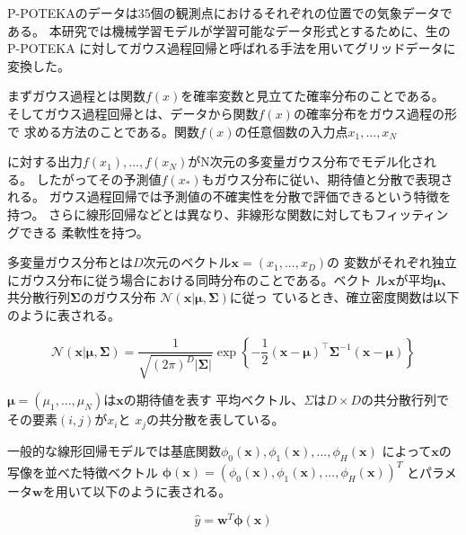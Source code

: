 P-POTEKAのデータは35個の観測点におけるそれぞれの位置での気象データである。
本研究では機械学習モデルが学習可能なデータ形式とするために、生のP-POTEKA
に対してガウス過程回帰と呼ばれる手法を用いてグリッドデータに変換した。

まずガウス過程とは関数$f(x)$を確率変数と見立てた確率分布のことである。
そしてガウス過程回帰とは、データから関数$f(x)$の確率分布をガウス過程の形で
求める方法のことである。関数$f(x)$の任意個数の入力点$x_{1}, ..., x_{N}$

に対する出力$f(x_{1}), ..., f(x_{N})$がN次元の多変量ガウス分布でモデル化される。
したがってその予測値$f(x_{*})$もガウス分布に従い、期待値と分散で表現される。
ガウス過程回帰では予測値の不確実性を分散で評価できるという特徴を持つ。
さらに線形回帰などとは異なり、非線形な関数に対してもフィッティングできる
柔軟性を持つ。

多変量ガウス分布とは$D$次元のベクトル$\boldsymbol{x} = (x_{1}, ..., x_{D})$の
変数がそれぞれ独立にガウス分布に従う場合における同時分布のことである。ベクト
ル$\boldsymbol{x}$が平均$\boldsymbol{\mu}$、共分散行列$\boldsymbol{\Sigma}$のガウス分布
$\mathcal{N}(\boldsymbol{x} | \boldsymbol{\mu}, \boldsymbol{\Sigma})$に従っ
ているとき、確立密度関数は以下のように表される。

\begin{equation}
\label{eq:multivariate-dist}
\mathcal{N}(\mathbf{x} | \boldsymbol{\mu}, \boldsymbol{\Sigma})
    = \frac{1}{\sqrt{(2 \pi)^D |\boldsymbol{\Sigma}|}}
      \exp \left\{
          - \frac{1}{2}
            (\mathbf{x} - \boldsymbol{\mu})^{\top}
            \boldsymbol{\Sigma}^{-1}
            (\mathbf{x} - \boldsymbol{\mu})
      \right\}
\end{equation}

$\boldsymbol{\mu} = (\mu_{1}, ..., \mu_{N})$は$\boldsymbol{x}$の期待値を表す
平均ベクトル、$\Sigma$は$D \times D$の共分散行列でその要素$(i, j)$が$x_{i}$と
$x_{j}$の共分散を表している。

一般的な線形回帰モデルでは基底関数$\phi_{0}(\boldsymbol{x}), \phi_{1}(\boldsymbol{x}), ..., \phi_{H}(\boldsymbol{x})$
によって$\boldsymbol{x}$の写像を並べた特徴ベクトル
$\boldsymbol{\phi}(\boldsymbol{x}) = (\phi_{0}(\boldsymbol{x}), \phi_{1}(\boldsymbol{x}), ..., \phi_{H}(\boldsymbol{x}))^T$
とパラメータ$\boldsymbol{w}$を用いて以下のように表される。

\begin{equation}
\label{eq:liner-regression-model}
\hat{y} = \boldsymbol{w}^T\boldsymbol{\phi}(\boldsymbol{x})
\end{equation}

